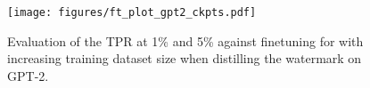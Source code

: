 \begin{figure}[t]
    \centering
    \texttt{[image: figures/ft\_plot\_gpt2\_ckpts.pdf]}
    \caption{Evaluation of the TPR at 1\% and 5\% against finetuning for \KGW with increasing training dataset size when distilling the watermark on \textsc{GPT-2}.}
    \label{fig:ft_tpr_gpt2_ckpts}
\end{figure}
